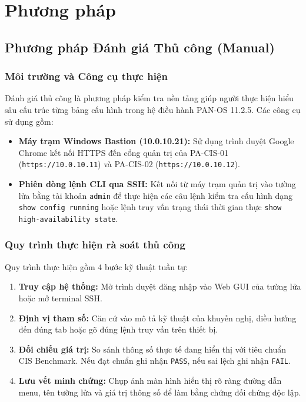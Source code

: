 \documentclass[12pt,a4paper]{article}
\begin{document}
\section{Phương pháp}

\subsection{Phương pháp Đánh giá Thủ công (Manual)}

\subsubsection{Môi trường và Công cụ thực hiện}
\noindent Đánh giá thủ công là phương pháp kiểm tra nền tảng giúp người thực hiện hiểu sâu cấu trúc từng bảng cấu hình trong hệ điều hành PAN-OS 11.2.5. Các công cụ sử dụng gồm:
\begin{itemize}
    \item \textbf{Máy trạm Windows Bastion (10.0.10.21):} Sử dụng trình duyệt Google Chrome kết nối HTTPS đến cổng quản trị của PA-CIS-01 (\texttt{https://10.0.10.11}) và PA-CIS-02 (\texttt{https://10.0.10.12}).
    \item \textbf{Phiên dòng lệnh CLI qua SSH:} Kết nối từ máy trạm quản trị vào tường lửa bằng tài khoản \texttt{admin} để thực hiện các câu lệnh kiểm tra cấu hình dạng \texttt{show config running} hoặc lệnh truy vấn trạng thái thời gian thực \texttt{show high-availability state}.
\end{itemize}

\subsubsection{Quy trình thực hiện rà soát thủ công}
\noindent Quy trình thực hiện gồm 4 bước kỹ thuật tuần tự:
\begin{enumerate}
    \item \textbf{Truy cập hệ thống:} Mở trình duyệt đăng nhập vào Web GUI của tường lửa hoặc mở terminal SSH.
    \item \textbf{Định vị tham số:} Căn cứ vào mô tả kỹ thuật của khuyến nghị, điều hướng đến đúng tab hoặc gõ đúng lệnh truy vấn trên thiết bị.
    \item \textbf{Đối chiếu giá trị:} So sánh thông số thực tế đang hiển thị với tiêu chuẩn CIS Benchmark. Nếu đạt chuẩn ghi nhận \texttt{PASS}, nếu sai lệch ghi nhận \texttt{FAIL}.
    \item \textbf{Lưu vết minh chứng:} Chụp ảnh màn hình hiển thị rõ ràng đường dẫn menu, tên tường lửa và giá trị thông số để làm bằng chứng đối chứng độc lập.
\end{enumerate}
\end{document}
